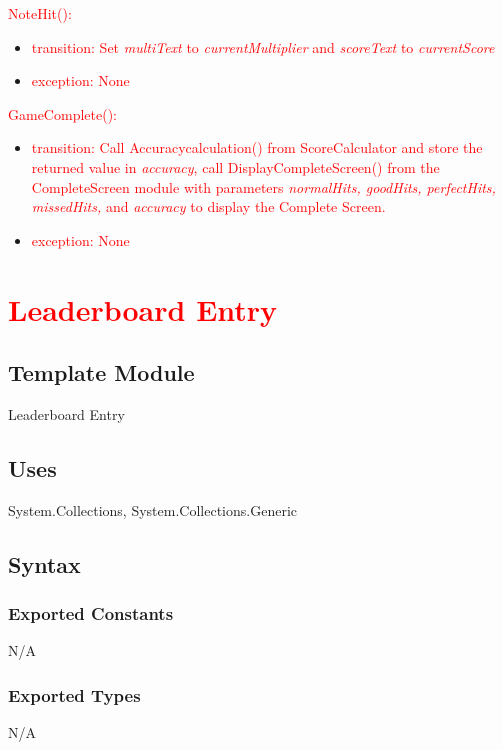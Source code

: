 \documentclass[12pt]{article}
\begin{document}
\noindent \textcolor{red}{NoteHit():}
\begin{itemize}
    \item \textcolor{red}{transition: Set \textit{multiText} to \textit{currentMultiplier} and \textit{scoreText} to \textit{currentScore}}
    \item \textcolor{red}{exception: None}
\end{itemize}

\noindent \textcolor{red}{GameComplete():}
\begin{itemize}
    \item \textcolor{red}{transition: Call Accuracycalculation() from ScoreCalculator and store the returned value in \textit{accuracy}, call DisplayCompleteScreen() from the CompleteScreen module with parameters \textit{normalHits, goodHits, perfectHits, missedHits,} and \textit{accuracy} to display the Complete Screen.}
    \item \textcolor{red}{exception: None}
\end{itemize}

\newpage
\section{\textcolor{red}{Leaderboard Entry}}

\subsection{Template Module}
Leaderboard Entry 

\subsection {Uses}
System.Collections, System.Collections.Generic

\subsection {Syntax}

\subsubsection {Exported Constants}
N/A

\subsubsection {Exported Types}
N/A
\end{document}
